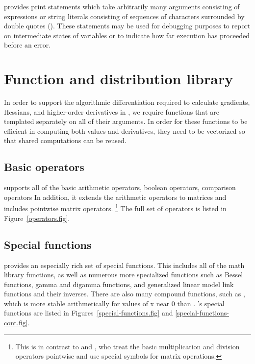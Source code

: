 \documentclass[article]{jss}
\begin{document}
 provides print statements which take arbitrarily many
arguments consisting of expressions or string literals consisting of
sequences of characters surrounded by double quotes ().
These statements may be used for debugging purposes to report on
intermediate states of variables or to indicate how far execution has
proceeded before an error.

\section{Function and distribution library}

In order to support the algorithmic differentiation required to
calculate gradients, Hessians, and higher-order derivatives in
, we require  functions that are 
templated separately on all of their arguments.  In order for these
functions to be efficient in computing both values and derivatives,
they need to be vectorized so that shared computations can be reused.

\subsection{Basic operators}

 supports all of the basic  arithmetic
operators, boolean operators, comparison operators  In addition, it
extends the arithmetic operators to matrices and includes pointwise
matrix operators.%
%
\footnote{This is in contrast to  and , who
  treat the basic multiplication and division operators pointwise and
  use special symbols for matrix operations.}
%
The full set of operators is listed in Figure~\ref{operators.fig}.

\subsection{Special functions}

 provides an especially rich set of special functions.
This includes all of the  math library functions, as
well as numerous more specialized functions such as Bessel functions,
gamma and digamma functions, and generalized linear model link
functions and their inverses.  There are also many compound functions,
such as , which is more stable arithmetically for
values of x near 0 than .  's special
functions are listed in Figures~\ref{special-functions.fig} and
\ref{special-functions-cont.fig}.  
\end{document}
